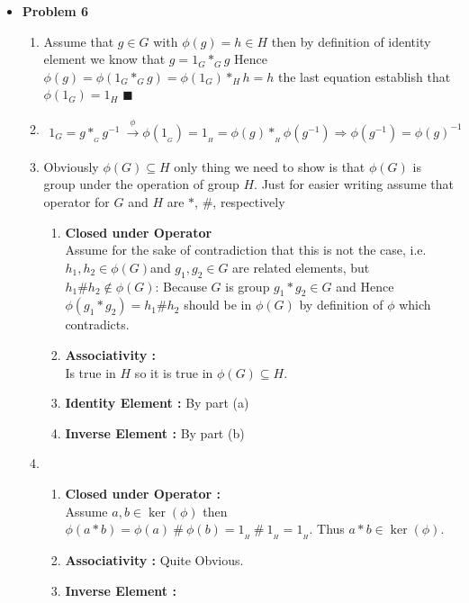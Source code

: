 \documentclass{article}
\begin{document}
\begin{itemize}
	\item{\textcolor{for}{\textbf{Problem 6}}}
		\begin{enumerate}[label=(\alph*)]
			\item Assume that $g\in G$ with $\phi(g)=h\in H$ then by definition of identity element we know that $g = 1_{G} *_{G} g$
				Hence $\phi(g) = \phi(1_{G} *_{G} g) = \phi(1_{G}) *_{H} h = h$ the last equation establish that 
				$\phi(1_{G}) = 1_{H}$ $\blacksquare$
			\item 
				\begin{align*}
					1_G = g *_{{}_{G}} g^{-1}\ \xrightarrow{\phi} \phi(1_{{}_{G}}) = 1_{{}_{H}} = \phi(g) *_{{}_{H}} \phi(g^{-1})
					\Rightarrow \phi(g^{-1}) = \left.\phi(g)\right.^{-1}\
				\end{align*}
			\item Obviously $\phi(G)\subseteq H$ only thing we need to show is that $\phi(G)$ is group under the operation of group $H$.
				Just for easier writing assume that operator for $G$ and $H$ are $*$, $\#$, respectively
				\begin{enumerate}[label=(\textbf{\Roman*})]
					\item{\textbf{Closed under Operator}} \\
						Assume for the sake of contradiction that this is not the case, i.e. 
						$h_1, h_2\in \phi(G)$and $g_1, g_2 \in G$ are related elements, but $h_1 \# h_2 \not\in \phi(G)$:
						Because $G$ is group $g_1*g_2\in G$ and Hence $\phi(g_1 * g_2) = h_1 \# h_2$ should be in
						$\phi(G)$ by definition of $\phi$ which contradicts.
					\item {\textbf{Associativity :}} \\
						Is true in $H$ so it is true in $\phi(G)\subseteq H$.
					\item {\textbf{Identity Element :}} By part (a)
					\item {\textbf{Inverse Element :}} By part (b) 
				\end{enumerate}
			\item
				\begin{enumerate}[label=(\textbf{\Roman*})]
					\item{\textbf{Closed under Operator :}} \\
						Assume $a,b \in \ker(\phi)$ then $\phi(a*b)= \phi(a)\ \#\ \phi(b) = 1_{{}_{H}}\ \#\ 1_{{}_{H}} = 1_{{}_{H}}$.
						Thus $a*b\in \ker(\phi)$.
					\item {\textbf{Associativity :}} Quite Obvious.
					\item {\textbf{Inverse Element :}} \\

\end{enumerate}
\end{enumerate}
\end{itemize}
\end{document}
